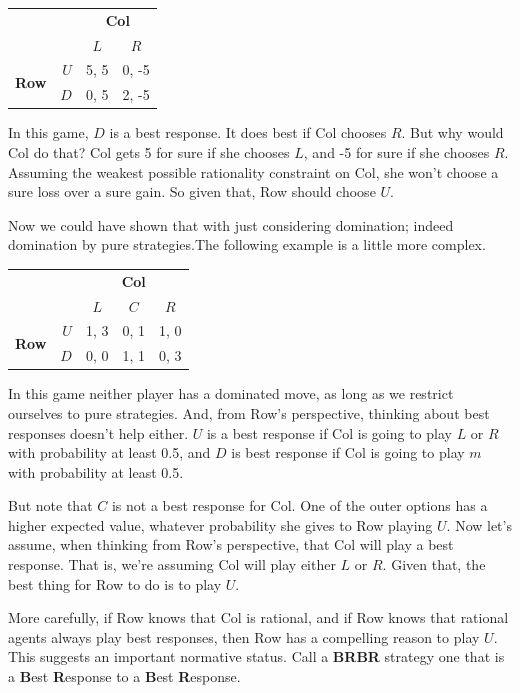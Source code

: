 \documentclass[openany]{book}
\begin{document}
\begin{center}
\begin{tabular}{l r | c c}
& & \multicolumn{2}{c}{\textbf{Col}} \\
& & $L$ & $R$ \\ \hline
\multirow{2}{*}{\textbf{Row}} & $U$ &  5, 5 & 0, -5\\
& $D$ & 0, 5 & 2, -5\\
\end{tabular}
\end{center}
In this game, $D$ is a best response. It does best if Col chooses $R$. But why would Col do that? Col gets 5 for sure if she chooses $L$, and -5 for sure if she chooses $R$. Assuming the weakest possible rationality constraint on Col, she won't choose a sure loss over a sure gain. So given that, Row should choose $U$.

Now we could have shown that with just considering domination; indeed domination by pure strategies.The following example is a little more complex.

\begin{center}
\begin{tabular}{l r | c c c}
& & \multicolumn{3}{c}{\textbf{Col}} \\
& & $L$ & $C$ & $R$ \\ \hline
\multirow{2}{*}{\textbf{Row}} & $U$ & 1, 3 & 0, 1 & 1, 0\\
& $D$ & 0, 0 & 1, 1 & 0, 3
\end{tabular}
\end{center}
In this game neither player has a dominated move, as long as we restrict ourselves to pure strategies. And, from Row's perspective, thinking about best responses doesn't help either. $U$ is a best response if Col is going to play $L$ or $R$ with probability at least 0.5, and $D$ is best response if Col is going to play $m$ with probability at least 0.5.

But note that $C$ is not a best response for Col. One of the outer options has a higher expected value, whatever probability she gives to Row playing $U$. Now let's assume, when thinking from Row's perspective, that Col will play a best response. That is, we're assuming Col will play either $L$ or $R$. Given that, the best thing for Row to do is to play $U$.

More carefully, if Row knows that Col is rational, and if Row knows that rational agents always play best responses, then Row has a compelling reason to play $U$. This suggests an important normative status. Call a \textbf{BRBR} strategy one that is a \textbf{B}est \textbf{R}esponse to a \textbf{B}est \textbf{R}esponse.
\end{document}
